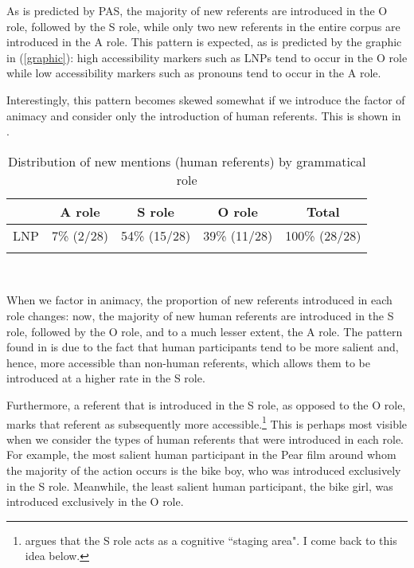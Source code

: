 As is predicted by PAS, the majority of new referents are introduced in the O role, followed by the S role, while only two new referents in the entire corpus are introduced in the A role. This pattern is expected, as is predicted by the graphic in (\ref{graphic}): high accessibility markers such as LNPs tend to occur in the O role while low accessibility markers such as pronouns tend to occur in the A role.

Interestingly, this pattern becomes skewed somewhat if we introduce the factor of animacy and consider only the introduction of human referents. This is shown in .
\begin{table} 

\caption{{Distribution of new mentions (human referents) by grammatical role}}
\begin{tabular}{ r  c  c  c  c }
\lsptoprule
 & A role & S role & O role & Total\\

\midrule
 \textsc{LNP} & 7{\%} (2/28) & 54{\%} (15/28) & 39{\%} (11/28) & 100{\%} (28/28) \\

\lspbottomrule
\end{tabular}\\
\label{newhumanreferents}

\end{table}
When we factor in animacy, the proportion of new referents introduced in each role changes: now, the majority of new human referents are introduced in the S role, followed by the O role, and to a much lesser extent, the A role. The pattern found in  is due to the fact that human participants tend to be more salient and, hence, more accessible than non-human referents, which allows them to be introduced at a higher rate in the S role. 

Furthermore, a referent that is introduced in the S role, as opposed to the O role, marks that referent as subsequently more accessible.\footnote{\citet[831]{dubois1987} argues that the S role acts as a cognitive ``staging area". I come back to this idea below.} This is perhaps most visible when we consider the types of human referents that were introduced in each role. For example, the most salient human participant in the Pear film around whom the majority of the action occurs is the bike boy, who was introduced exclusively in the S role. Meanwhile, the least salient human participant, the bike girl, was introduced exclusively in the O role. 


